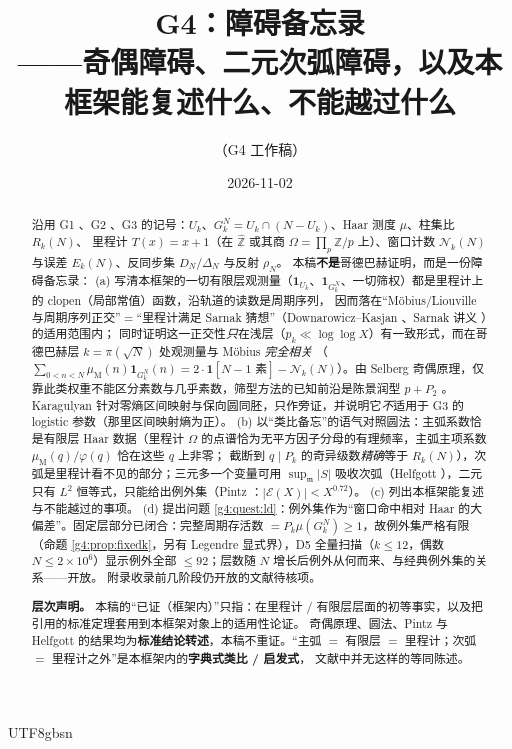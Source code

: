 \documentclass[11pt,a4paper]{article}
\newcommand{\Zhat}{\widehat{\mathbb Z}}
\newcommand{\Haar}{\mu}
\newcommand{\Cnt}{\mathcal N}          %
\newcommand{\Om}{\Omega}               %
\newcommand{\Mob}{\mu_{\mathrm{M}}}    %
\newcommand{\Exc}{\mathcal E}          %
\newcommand{\Min}{\mathfrak m}
\theoremstyle{plain}
\theoremstyle{definition}
\begin{document}
\begin{CJK}{UTF8}{gbsn}

\title{G4：障碍备忘录\\[2pt]
\large ——{}奇偶障碍、二元次弧障碍，以及本框架能复述什么、不能越过什么}
\author{（G4 工作稿）}
\date{2026-11-02}
\maketitle

\begin{abstract}
沿用 G1 \cite{G1}、G2 \cite{G2}、G3 \cite{G3} 的记号：$U_k$、$G_k^N=U_k\cap(N-U_k)$、Haar 测度 $\Haar$、柱集比 $R_k(N)$、
里程计 $T(x)=x+1$（在 $\Zhat$ 或其商 $\Om=\prod_p\mathbb Z/p$ 上）、窗口计数 $\Cnt_k(N)$ 与误差 $E_k(N)$、反同步集 $D_N$/$\Delta_N$ 与反射 $\rho_N$。
本稿\textbf{不是}哥德巴赫证明，而是一份障碍备忘录：
(a) 写清本框架的一切有限层观测量（$\mathbf 1_{U_k}$、$\mathbf 1_{G_k^N}$、一切筛权）都是里程计上的 clopen（局部常值）函数，沿轨道的读数是周期序列，
因而落在“M\"obius/Liouville 与周期序列正交”$=$“里程计满足 Sarnak 猜想”（Downarowicz--Kasjan \cite{DK15}、Sarnak 讲义 \cite{Sar10}）的适用范围内；
同时证明这一正交性\emph{只}在浅层（$p_k\ll\log\log X$）有一致形式，而在哥德巴赫层 $k=\pi(\sqrt N)$ 处观测量与 M\"obius \emph{完全相关}
（$\sum_{0<n<N}\Mob(n)\mathbf 1_{G_k^N}(n)=2\cdot\mathbf 1[N-1\text{ 素}]-\Cnt_k(N)$）。由 Selberg 奇偶原理，仅靠此类权重不能区分素数与几乎素数，筛型方法的已知前沿是陈景润型 $p+P_2$ \cite{Chen73}。
Karagulyan \cite{Kar15} 针对零熵区间映射与保向圆同胚，只作旁证，并说明它\emph{不}适用于 G3 的 logistic 参数（那里区间映射熵为正）。
(b) 以“类比备忘”的语气对照圆法：主弧系数恰是有限层 Haar 数据（里程计 $\Om$ 的点谱恰为无平方因子分母的有理频率，主弧主项系数 $\Mob(q)/\varphi(q)$ 恰在这些 $q$ 上非零；
截断到 $q\mid P_k$ 的奇异级数\emph{精确}等于 $R_k(N)$），次弧是里程计看不见的部分；三元多一个变量可用 $\sup_{\Min}|S|$ 吸收次弧（Helfgott \cite{Hel13,Hel15}），二元只有 $L^2$ 恒等式，只能给出例外集（Pintz \cite{Pin18}：$|\Exc(X)|<X^{0.72}$）。
(c) 列出本框架能复述与不能越过的事项。
(d) 提出问题 \ref{g4:quest:ld}：例外集作为“窗口命中相对 Haar 的大偏差”。固定层部分已闭合：完整周期存活数 $=P_k\Haar(G_k^N)\ge1$，故例外集严格有限（命题 \ref{g4:prop:fixedk}，另有 Legendre 显式界），D5 \cite{D5} 全量扫描（$k\le12$，偶数 $N\le2\times10^6$）显示例外全部 $\le92$；层数随 $N$ 增长后例外从何而来、与经典例外集的关系——开放。
附录收录前几阶段仍开放的文献待核项。

\textbf{层次声明。} 本稿的“已证（框架内）”只指：在里程计 / 有限层层面的初等事实，以及把引用的标准定理套用到本框架对象上的适用性论证。
奇偶原理、圆法、Pintz 与 Helfgott 的结果均为\textbf{标准结论转述}，本稿不重证。“主弧 $=$ 有限层 $=$ 里程计；次弧 $=$ 里程计之外”是本框架内的\textbf{字典式类比 / 启发式}，
文献中并无这样的等同陈述。


\end{abstract}
\end{CJK}
\end{document}
